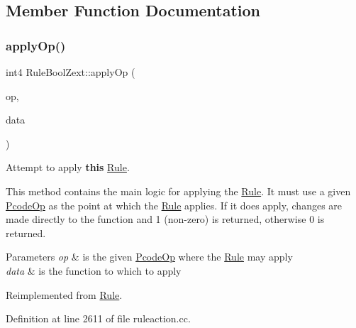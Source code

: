 \subsection{Member Function Documentation}
\mbox{\label{class_rule_bool_zext_a167cc1b2d30a03f4efda236b63fa1838}} 
\subsubsection{\texorpdfstring{applyOp()}{applyOp()}}
{\footnotesize\ttfamily int4 Rule\+Bool\+Zext\+::apply\+Op (\begin{DoxyParamCaption}\item[{\mbox{\hyperlink{class_pcode_op}{Pcode\+Op}} $\ast$}]{op,  }\item[{\mbox{\hyperlink{class_funcdata}{Funcdata}} \&}]{data }\end{DoxyParamCaption})\hspace{0.3cm}{\ttfamily [virtual]}}



Attempt to apply {\bfseries{this}} \mbox{\hyperlink{class_rule}{Rule}}. 

This method contains the main logic for applying the \mbox{\hyperlink{class_rule}{Rule}}. It must use a given \mbox{\hyperlink{class_pcode_op}{Pcode\+Op}} as the point at which the \mbox{\hyperlink{class_rule}{Rule}} applies. If it does apply, changes are made directly to the function and 1 (non-\/zero) is returned, otherwise 0 is returned. 
\begin{DoxyParams}{Parameters}
{\em op} & is the given \mbox{\hyperlink{class_pcode_op}{Pcode\+Op}} where the \mbox{\hyperlink{class_rule}{Rule}} may apply \\
\hline
{\em data} & is the function to which to apply \\
\hline
\end{DoxyParams}


Reimplemented from \mbox{\hyperlink{class_rule_a4e3e61f066670175009f60fb9dc60848}{Rule}}.



Definition at line 2611 of file ruleaction.\+cc.

